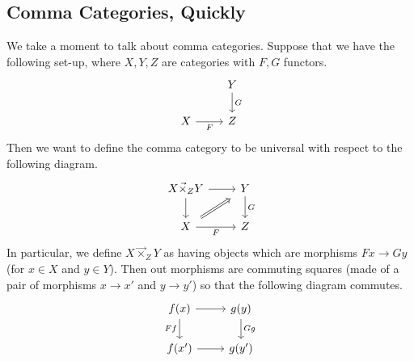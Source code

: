 \documentclass[../notes.tex]{subfiles}
\begin{document}
\subsection{Comma Categories, Quickly}
We take a moment to talk about comma categories. Suppose that we have the following set-up, where $X,Y,Z$ are categories with $F,G$ functors.
\[\begin{tikzcd}
	& Y \\
	X & Z
	\arrow["F"', from=2-1, to=2-2]
	\arrow["G", from=1-2, to=2-2]
\end{tikzcd}\]
Then we want to define the comma category to be universal with respect to the following diagram.
\[\begin{tikzcd}
	{X\vec{\times}_ZY} & Y \\
	X & Z
	\arrow["F"', from=2-1, to=2-2]
	\arrow["G", from=1-2, to=2-2]
	\arrow[from=1-1, to=2-1]
	\arrow[from=1-1, to=1-2]
	\arrow[shorten <=5pt, shorten >=5pt, Rightarrow, from=2-1, to=1-2]
\end{tikzcd}\]
In particular, we define $X\vec\times_ZY$ as having objects which are morphisms $Fx\to Gy$ (for $x\in X$ and $y\in Y$). Then out morphisms are commuting squares (made of a pair of morphisms $x\to x'$ and $y\to y'$) so that the following diagram commutes.
\[\begin{tikzcd}
	{f(x)} & {g(y)} \\
	{f(x')} & {g(y')}
	\arrow["Ff"', from=1-1, to=2-1]
	\arrow["Gg", from=1-2, to=2-2]
	\arrow[from=1-1, to=1-2]
	\arrow[from=2-1, to=2-2]
\end{tikzcd}\]
\end{document}
